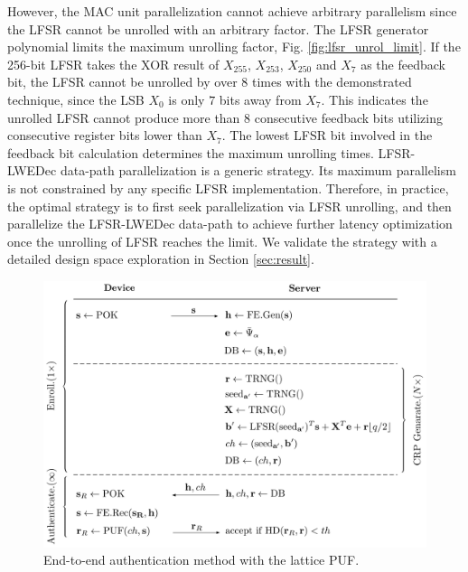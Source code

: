 However, the MAC unit parallelization cannot achieve arbitrary parallelism since the LFSR cannot be unrolled with an arbitrary factor. The LFSR generator polynomial limits the maximum unrolling factor, Fig. \ref{fig:lfsr_unrol_limit}. If the 256-bit LFSR takes the XOR result of $X_{255}$, $X_{253}$, $X_{250}$ and $X_{7}$ as the feedback bit, the LFSR cannot be unrolled by over 8 times with the demonstrated technique, since the LSB $X_{0}$ is only $7$ bits away from $X_{7}$. This indicates the unrolled LFSR cannot produce more than $8$ consecutive feedback bits utilizing consecutive register bits lower than $X_{7}$. The lowest LFSR bit involved in the feedback bit calculation determines the maximum unrolling times. LFSR-LWEDec data-path parallelization is a generic strategy. Its maximum parallelism is not constrained by any specific LFSR implementation. Therefore, in practice, the optimal strategy is to first seek parallelization via LFSR unrolling, and then parallelize the LFSR-LWEDec data-path to achieve further latency optimization once the unrolling of LFSR reaches the limit. We validate the strategy with a detailed design space exploration in Section \ref{sec:result}.

\DIFdelbegin %
{%
}
\DIFdelend %

\begin{figure}[t!]
\centering
\DIFdelbeginFL %
\DIFdelendFL \DIFaddbeginFL \includegraphics[width = 1.0\linewidth]{./figs/protocol}
\DIFaddendFL \caption{End-to-end authentication method with the lattice PUF.}
\label{fig:protocol}
\end{figure}

